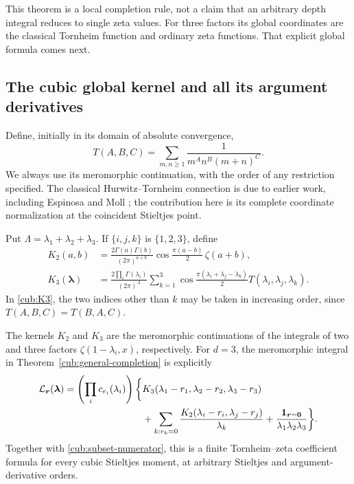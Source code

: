 This theorem is a local completion rule, not a claim that an arbitrary
depth integral reduces to single zeta values.  For three factors its
global coordinates are the classical Tornheim function and ordinary
zeta functions.  That explicit global formula comes next.

\subsection{The cubic global kernel and all its argument derivatives}

Define, initially in its domain of absolute convergence,
\begin{equation}\label{cub:T-def}
 T(A,B,C)=\sum_{m,n\ge1}\frac{1}{m^A n^B(m+n)^C}.
\end{equation}
We always use its meromorphic continuation, with the order of any
restriction specified.  The classical Hurwitz--Tornheim connection is
due to earlier work, including Espinosa and Moll \cite{EM2006}; the
contribution here is its complete coordinate normalization at the
coincident Stieltjes point.

Put $\Lambda=\lambda_1+\lambda_2+\lambda_3$.  If $\{i,j,k\}$ is
$\{1,2,3\}$, define
\begin{align}
 K_2(a,b)&=\frac{2\Gamma(a)\Gamma(b)}{(2\pi)^{a+b}}
       \cos\frac{\pi(a-b)}2\,\zeta(a+b),\label{cub:K2}\\
 K_3(\boldsymbol\lambda)
 &=\frac{2\prod_i\Gamma(\lambda_i)}{(2\pi)^\Lambda}
   \sum_{k=1}^3
    \cos\frac{\pi(\lambda_i+\lambda_j-\lambda_k)}2
       T(\lambda_i,\lambda_j,\lambda_k).
       \label{cub:K3}
\end{align}
In \eqref{cub:K3}, the two indices other than $k$ may be taken in
increasing order, since $T(A,B,C)=T(B,A,C)$.

\begin{proposition}
\label{cub:global}
The kernels $K_2$ and $K_3$ are the meromorphic continuations of the
integrals of two and three factors $\zeta(1-\lambda_i,x)$,
respectively.  For $d=3$, the meromorphic integral in
Theorem~\ref{cub:general-completion} is explicitly
\begin{align}
 \mathcal L_{\boldsymbol r}(\boldsymbol\lambda)
 =\left(\prod_i c_{r_i}(\lambda_i)\right)
 \bigg\{&K_3(\lambda_1-r_1,\lambda_2-r_2,\lambda_3-r_3)
       \notag\\
 &+\sum_{k:r_k=0}\frac{
       K_2(\lambda_i-r_i,\lambda_j-r_j)}{\lambda_k}
       +\frac{\mathbf1_{\boldsymbol r=\boldsymbol0}}
                    {\lambda_1\lambda_2\lambda_3}\bigg\}.
 \label{cub:Lr}
\end{align}
Together with \eqref{cub:subset-numerator}, this is a finite
Tornheim--zeta coefficient formula for every cubic Stieltjes moment,
at arbitrary Stieltjes and argument-derivative orders.
\end{proposition}

